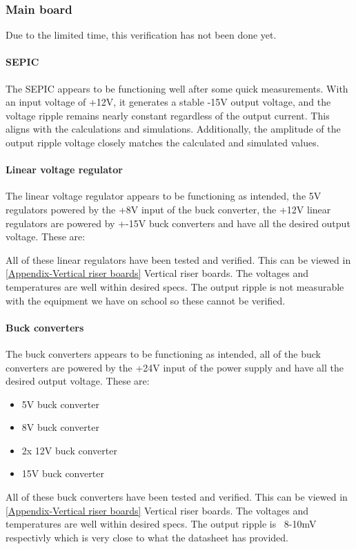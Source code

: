 \subsubsection{Main board}
Due to the limited time, this verification has not been done yet.
\paragraph{SEPIC}
The SEPIC appears to be functioning well after some quick measurements. With an input voltage of +12V, it generates a stable -15V output voltage, and the voltage ripple remains nearly constant regardless of the output current. This aligns with the calculations and simulations. Additionally, the amplitude of the output ripple voltage closely matches the calculated and simulated values.

\paragraph{Linear voltage regulator}
The linear voltage regulator appears to be functioning as intended, the 5V regulators powered by the +8V input of the buck converter, the +12V linear regulators are powered by +-15V buck converters and have all the desired output voltage. These are:
 
All of these linear regulators have been tested and verified. This can be viewed in \ref{Appendix-Vertical riser boards} Vertical riser boards. The voltages and temperatures are well within desired specs. The output ripple is not measurable with the equipment we have on school so these cannot be verified.

\paragraph{Buck converters}
The buck converters appears to be functioning as intended, all of the buck converters are powered by the +24V input of the power supply and have all the desired output voltage. These are:
\begin{itemize}
\item 5V buck converter
\item 8V buck converter
\item 2x 12V buck converter
\item 15V buck converter
\end{itemize}  
All of these buck converters have been tested and verified. This can be viewed in \ref{Appendix-Vertical riser boards} Vertical riser boards. The voltages and temperatures are well within desired specs. The output ripple is ~8-10mV respectivly which is very close to what the datasheet has provided. 

